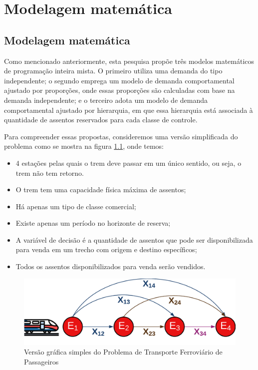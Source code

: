 \chapter{Modelagem matemática }

\section{Modelagem matemática}

Como mencionado anteriormente, esta pesquisa propõe três modelos matemáticos de programação inteira mista. O primeiro utiliza uma demanda do tipo independente; o segundo emprega um modelo de demanda comportamental ajustado por proporções, onde essas proporções são calculadas com base na demanda independente; e o terceiro adota um modelo de demanda comportamental ajustado por hierarquia, em que essa hierarquia está associada à quantidade de assentos reservados para cada classe de controle.

Para compreender essas propostas, consideremos uma versão simplificada do problema como se mostra na figura \ref{fig: fig1}, onde temos:

\begin{itemize}
	\item 4 estações pelas quais o trem deve passar em um único sentido, ou seja, o trem não tem retorno.
	\item O trem tem uma capacidade física máxima de assentos;
	\item Há apenas um tipo de classe comercial;
	\item Existe apenas um período no horizonte de reserva;
	\item A variável de decisão é a quantidade de assentos que pode ser disponibilizada para venda em um trecho com origem e destino específicos;
	\item Todos os assentos disponibilizados para venda serão vendidos.
\end{itemize}

\begin{figure}[H]
	\begin{center}
		\includegraphics[scale=0.18]{img/repre_ini1.png}
		\caption{Versão gráfica simples do Problema de Transporte Ferroviário de Passageiros}
		\label{fig: fig1}
	\end{center}
\end{figure}


